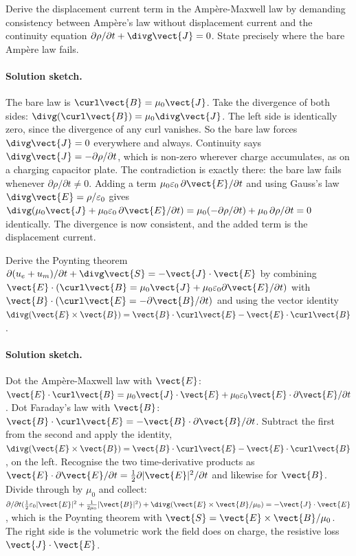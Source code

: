 \begin{exercise}
Derive the displacement current term in the Amp\`ere-Maxwell law by
demanding consistency between Amp\`ere's law without displacement
current and the continuity equation $\partial \rho/\partial t +
\divg \vect{J} = 0$. State precisely where the bare Amp\`ere law
fails.

\paragraph{Solution sketch.} The bare law is $\curl\vect{B} = \mu_0
\vect{J}$. Take the divergence of both sides: $\divg(\curl\vect{B}) =
\mu_0\divg\vect{J}$. The left side is identically zero, since the
divergence of any curl vanishes. So the bare law forces $\divg\vect{J}
= 0$ everywhere and always. Continuity says $\divg\vect{J} = -\partial
\rho/\partial t$, which is non-zero wherever charge accumulates, as on a
charging capacitor plate. The contradiction is exactly there: the bare
law fails whenever $\partial\rho/\partial t \neq 0$. Adding a term
$\mu_0\varepsilon_0\,\partial\vect{E}/\partial t$ and using Gauss's law
$\divg\vect{E} = \rho/\varepsilon_0$ gives $\divg(\mu_0\vect{J} +
\mu_0\varepsilon_0\,\partial\vect{E}/\partial t) = \mu_0(-\partial\rho/
\partial t) + \mu_0\,\partial\rho/\partial t = 0$ identically. The
divergence is now consistent, and the added term is the displacement
current.
\end{exercise}

\begin{exercise}
Derive the Poynting theorem $\partial (u_{e}+u_{m})/\partial t +
\divg \vect{S} = -\vect{J}\cdot\vect{E}$ by combining $\vect{E}\cdot
(\curl \vect{B} = \mu_{0}\vect{J} + \mu_{0}\varepsilon_{0}\partial
\vect{E}/\partial t)$ with $\vect{B}\cdot(\curl \vect{E} = -\partial
\vect{B}/\partial t)$ and using the vector identity $\divg(\vect{E}
\times \vect{B}) = \vect{B}\cdot \curl \vect{E} - \vect{E}\cdot \curl
\vect{B}$.

\paragraph{Solution sketch.} Dot the Amp\`ere-Maxwell law with $\vect{E}$:
$\vect{E}\cdot\curl\vect{B} = \mu_0\vect{J}\cdot\vect{E} + \mu_0
\varepsilon_0\vect{E}\cdot\partial\vect{E}/\partial t$. Dot Faraday's
law with $\vect{B}$: $\vect{B}\cdot\curl\vect{E} = -\vect{B}\cdot
\partial\vect{B}/\partial t$. Subtract the first from the second and
apply the identity, $\divg(\vect{E}\times\vect{B}) = \vect{B}\cdot
\curl\vect{E} - \vect{E}\cdot\curl\vect{B}$, on the left. Recognise the
two time-derivative products as $\vect{E}\cdot\partial\vect{E}/\partial
t = \tfrac12\partial|\vect{E}|^2/\partial t$ and likewise for $\vect{B}$.
Divide through by $\mu_0$ and collect: $\partial/\partial t(\tfrac12
\varepsilon_0|\vect{E}|^2 + \tfrac{1}{2\mu_0}|\vect{B}|^2) + \divg(
\vect{E}\times\vect{B}/\mu_0) = -\vect{J}\cdot\vect{E}$, which is the
Poynting theorem with $\vect{S} = \vect{E}\times\vect{B}/\mu_0$. The
right side is the volumetric work the field does on charge, the resistive
loss $\vect{J}\cdot\vect{E}$.
\end{exercise}


